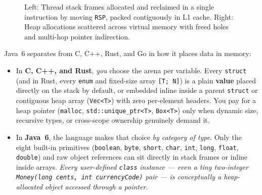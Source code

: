 \begin{figure}[H]
\caption{Left: Thread stack frames allocated and reclaimed in a single instruction by moving \texttt{RSP}, packed contiguously in L1 cache. Right: Heap allocations scattered across virtual memory with freed holes and multi-hop pointer indirection.}
\label{ch01:fig-stack-vs-heap}
\end{figure}

Java~6 separates from C, C++, Rust, and Go in how it places data in memory:
\begin{itemize}
  \item In \textbf{C, C++, and Rust}, \emph{you} choose the arena per variable. Every \texttt{struct} (and in Rust, every \texttt{enum} and fixed-size array \texttt{[T; N]}) is a plain \textbf{value} placed directly on the stack by default, or embedded inline inside a parent \texttt{struct} or contiguous heap array (\texttt{Vec<T>}) with zero per-element headers. You pay for a heap pointer (\texttt{malloc}, \texttt{std::unique\_ptr<T>}, \texttt{Box<T>}) only when dynamic size, recursive types, or cross-scope ownership genuinely demand it.
  \item In \textbf{Java~6}, the language makes that choice \emph{by category of type}. Only the eight built-in primitives (\texttt{boolean}, \texttt{byte}, \texttt{short}, \texttt{char}, \texttt{int}, \texttt{long}, \texttt{float}, \texttt{double}) and raw object references can sit directly in stack frames or inline inside arrays. \emph{Every user-defined \texttt{class} instance --- even a tiny two-integer \texttt{Money(long cents, int currencyCode)} pair --- is conceptually a heap-allocated object accessed through a pointer.}
\end{itemize}

